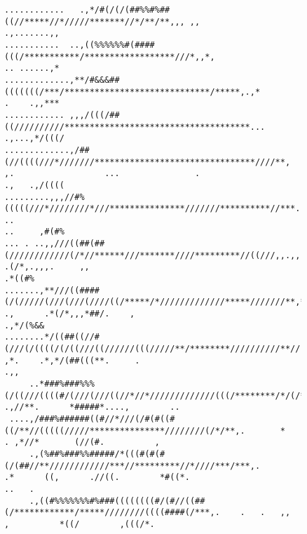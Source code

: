 \documentclass[a4paper, 20pt,fleqn]{article}
\begin{document}
\begin{figure}
\begin{verbatim}
............   .,*/#(/(/(##%%#%##((//*****//*/////*******//*/**/**,,, ,,                                                                                                                  .,.......,,
...........  ..,((%%%%%%#(####(((/***********/******************///*,,*,                                                                                                                  .. ......,*
.............,**/#&&&##(((((((/***/*****************************/*****,.,*                                                                                                                .    .,,***
............ ,,,/(((/##((//////////*************************************...                                                                                                              .,...,*/(((/
.............,/##(//((((///*///////********************************////**, ,.                  ...               .                                                                       .,   .,/((((
.........,,,//#%(((((///*////////*///***************///////**********//***....                                 ..                                                                        ..     ,#(#%
... . ..,,///((##(##(////////////(/*//******///*******////*********//((///,,.,,                              .(/*,.,,,.     ,,                                                                 .*((#%
.......,**///((####(/(/////(///(///(////((/*****/*/////////////*****///////**,*,                    .,      .*(/*,,,*##/.    ,                                                               .,*/(%&&
........*/((##((//#(///(/((((/(/((///((//////(((/////**/********//////////**//,.                   ,*.    .*,*/(##(((**.     .                                                                    .,,
     ..*###%###%%%(/((///((((#/(///(///((//*//*/////////////(((/********/*/(/**,.                .,//**.      *#####*....,        ..                                                                 
 ....,/###%######((#//*///(/#(#((#((/**//(((((/////***************////////(/*/**,.       *       . ,*//*       (//(#.          ,                                                                     
     .,(%##%###%%#####/*(((#(#(#(/(##//**////////////***//*********//*////***/***,.           .*      ((,      .//((.        *#((*.                                                           ..   . 
     .,((#%%%%%%%#%###((((((((#/(#//((##(/************/*****////////((((####(/***,.    .   .   ,,     ,          *((/        ,(((/*.                                                                 

\end{verbatim}
\end{figure}
\end{document}
